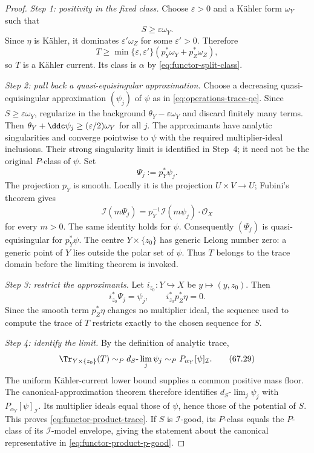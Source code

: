 \begin{proof}
\noindent\emph{Step 1: positivity in the fixed class.}
Choose $\varepsilon>0$ and a K\"ahler form $\omega_Y$ such that
\[
                         S\geq\varepsilon\omega_Y.
\]
Since $\eta$ is K\"ahler, it dominates
$\varepsilon'\omega_Z$ for some $\varepsilon'>0$. Therefore
\[
 T\geq
 \min\{\varepsilon,\varepsilon'\}
      (p_Y^*\omega_Y+p_Z^*\omega_Z),
\tag{67.25}\label{eq:functor-product-positive}
\]
so $T$ is a K\"ahler current.  Its class is $\alpha$ by
\eqref{eq:functor-split-class}.

\medskip
\noindent\emph{Step 2: pull back a quasi-equisingular approximation.}
Choose a decreasing quasi-equisingular approximation $(\psi_j)$ of
$\psi$ as in \eqref{eq:operations-trace-qe}. Since
$S\geq\varepsilon\omega_Y$, regularize in the background
$\theta_Y-\varepsilon\omega_Y$ and discard finitely many terms. Then
$\theta_Y+\ddc\psi_j\geq(\varepsilon/2)\omega_Y$ for all $j$.
The approximants have analytic singularities and converge pointwise to
$\psi$ with the required multiplier-ideal inclusions. Their strong
singularity limit is identified in Step~4; it need not be the original
$P$-class of $\psi$.
Set
\[
                          \Psi_j:=p_Y^*\psi_j.
\tag{67.26}\label{eq:functor-product-approximants}
\]
The projection $p_Y$ is smooth. Locally it is the projection
$U\times V\to U$; Fubini's theorem gives
\[
     \mathcal I(m\Psi_j)
                =p_Y^{-1}\mathcal I(m\psi_j)\cdot\mathcal O_X
\tag{67.27}\label{eq:functor-smooth-ideal-pullback}
\]
for every $m>0$. The same identity holds for $\psi$.
Consequently $(\Psi_j)$ is quasi-equisingular for $p_Y^*\psi$.
The centre $Y\times\{z_0\}$ has generic Lelong number zero: a generic
point of $Y$ lies outside the polar set of $\psi$. Thus $T$ belongs to
the trace domain before the limiting theorem is invoked.

\medskip
\noindent\emph{Step 3: restrict the approximants.}
Let $i_{z_0}:Y\hookrightarrow X$ be
$y\mapsto(y,z_0)$. Then
\[
                         i_{z_0}^*\Psi_j=\psi_j,
          \qquad i_{z_0}^*p_Z^*\eta=0.
\tag{67.28}\label{eq:functor-product-restriction}
\]
Since the smooth term $p_Z^*\eta$ changes no multiplier ideal, the
sequence used to compute the trace of $T$ restricts exactly to the
chosen sequence for $S$.

\medskip
\noindent\emph{Step 4: identify the limit.}
By the definition of analytic trace,
\[
       \Tr_{Y\times\{z_0\}}(T)
          \sim_P d_S\text{-}\lim_j\psi_j
          \sim_P P_{\alpha_Y}[\psi]_{\mathcal I}.
\tag{67.29}\label{eq:functor-product-limit}
\]
The uniform K\"ahler-current lower bound supplies a common positive
mass floor. The canonical-approximation theorem
\cite[Corollary~7.1.2]{XiaBook} therefore identifies
$d_S\text{-}\lim_j\psi_j$ with $P_{\alpha_Y}[\psi]_{\mathcal I}$.
Its multiplier ideals equal those of $\psi$, hence those of the
potential of $S$. This proves
\eqref{eq:functor-product-trace}. If $S$ is $\mathcal I$-good,
its $P$-class equals the $P$-class of its
$\mathcal I$-model envelope, giving the statement about the canonical
representative in
\eqref{eq:functor-product-p-good}.
\end{proof}

